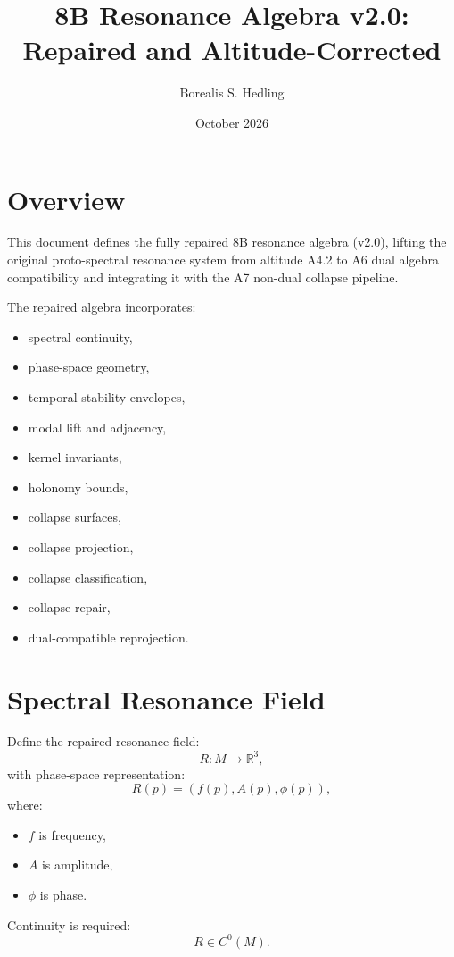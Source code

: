 \documentclass[11pt]{article}
\title{8B Resonance Algebra v2.0: Repaired and Altitude-Corrected}
\author{Borealis S. Hedling}
\date{October 2026}
\begin{document}
\maketitle

\section*{Overview}

This document defines the fully repaired 8B resonance algebra (v2.0),
lifting the original proto-spectral resonance system from altitude A4.2
to A6 dual algebra compatibility and integrating it with the A7
non-dual collapse pipeline.

The repaired algebra incorporates:
\begin{itemize}
  \item spectral continuity,
  \item phase-space geometry,
  \item temporal stability envelopes,
  \item modal lift and adjacency,
  \item kernel invariants,
  \item holonomy bounds,
  \item collapse surfaces,
  \item collapse projection,
  \item collapse classification,
  \item collapse repair,
  \item dual-compatible reprojection.
\end{itemize}

\section{Spectral Resonance Field}

Define the repaired resonance field:
\[
R : M \to \mathbb{R}^3,
\]
with phase-space representation:
\[
R(p) = (f(p), A(p), \phi(p)),
\]
where:
\begin{itemize}
  \item $f$ is frequency,
  \item $A$ is amplitude,
  \item $\phi$ is phase.
\end{itemize}

Continuity is required:
\[
R \in C^0(M).
\]

\end{document}
